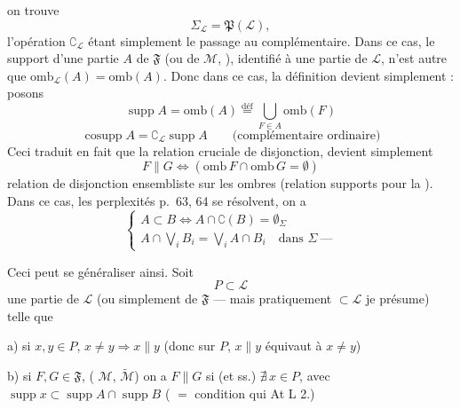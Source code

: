 \documentclass[11pt,a4paper]{article}
\begin{document}
on trouve
\[
  \Sigma_{\mathcal{L}} = \mathfrak{P}(\mathcal{L}) ,
\]
l'opération $\complement_{\mathcal{L}}$ étant simplement le passage au complémentaire. Dans ce cas, le support d'une partie $A$ de $\mathfrak{F}$ (ou de $\mathcal{M}$, ), identifié à une partie de $\mathcal{L}$, n'est autre que $\mathrm{omb}_{\mathcal{L}}(A) = \mathrm{omb}(A)$. Donc dans ce cas, la définition devient simplement : posons
\[
  \operatorname{supp} A = \mathrm{omb}(A) \overset{\mathrm{déf}}{=} \bigcup_{F \in A} \mathrm{omb}(F)
\]
\[
  \operatorname{cosupp} A = \complement_{\mathcal{L}} \operatorname{supp} A \qquad \text{(complémentaire ordinaire)}
\]
Ceci traduit en fait que la relation cruciale de disjonction, devient simplement
\[
  F \parallel G \iff (\mathrm{omb}\, F \cap \mathrm{omb}\, G = \emptyset)
\]
relation de disjonction ensembliste sur les ombres (relation  supports pour la  ). Dans ce cas, les perplexités p.\ 63, 64 se résolvent, on a
\[
  \left\lbrace
  \begin{array}{l}
    A \subset B \iff A \cap \complement(B) = \emptyset_{\Sigma} \\
    A \cap \bigvee_i B_i = \bigvee_i A \cap B_i \quad \text{dans } \Sigma \ —
  \end{array}
  \right.
\]

Ceci peut se généraliser ainsi. Soit
\[
  P \subset \mathcal{L}
\]
une partie de $\mathcal{L}$ (ou simplement de $\mathfrak{F}$ — mais pratiquement   $\subset \mathcal{L}$ je présume) telle que

a) si $x, y \in P$, $x \neq y \Rightarrow x \parallel y$ (donc sur $P$, $x \parallel y$ équivaut à $x \neq y$)

b) si $F, G \in \mathfrak{F}$, ( $\mathcal{M}$, \ill{} \ill{} \ill{} $\widetilde{\mathcal{M}}$)  \struck{\ill{}} on a $F \parallel G$ si (et ss.) $\nexists\, x \in P$, \struck{\ill{}} avec $\operatorname{supp} x \subset \operatorname{supp} A \cap \operatorname{supp} B$  ( $=$ condition qui  At L 2.)
\end{document}
